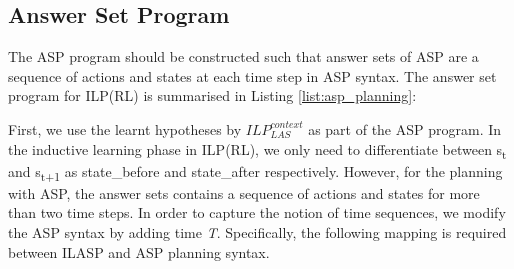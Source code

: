 \subsection{Answer Set Program}
\label{subsec:answer_set_program}
The ASP program should be constructed such that answer sets of ASP are a sequence of actions and states at each time step in ASP syntax. 
The answer set program for ILP(RL) is summarised in Listing \ref{list:asp_planning}:


First, we use the learnt hypotheses by $ILP_{LAS}^{context}$ as part of the ASP program.
In the inductive learning phase in ILP(RL), we only need to differentiate between s\textsubscript{t} and s\textsubscript{t+1} as \textsf{state\_before} and \textsf{state\_after} respectively.
However, for the planning with ASP, the answer sets contains a sequence of actions and states for more than two time steps. 
In order to capture the notion of time sequences, we modify the ASP syntax by 
adding time \textit{T}. Specifically, the following mapping is required between ILASP and ASP planning syntax.

